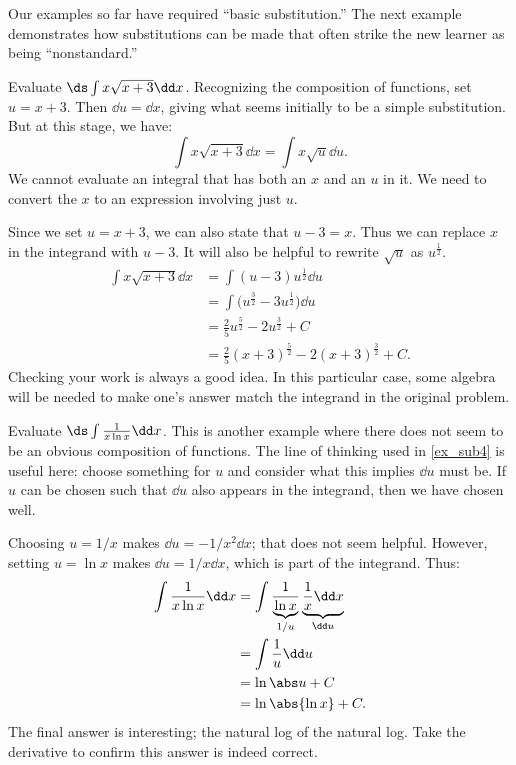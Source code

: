 Our examples so far have required ``basic substitution.'' The next example demonstrates how substitutions can be made that often strike the new learner as being ``nonstandard.''

\begin{example}\label{ex_sub4}%
Evaluate $\ds\int x\sqrt{x+3}\dd x$.
\solution
Recognizing the composition of functions, set $u = x+3$. Then $\dd u = \dd x$, giving what seems initially to be a simple substitution. But at this stage, we have:\vspace{-.3\baselineskip}
	\[\int x\sqrt{x+3}\dd x = \int x\sqrt{u}\dd u.\]
We cannot evaluate an integral that has both an $x$ and an $u$ in it. We need to convert the $x$ to an expression involving just $u$.

Since we set $u = x+3$, we can also state that $u-3 = x$. Thus we can replace $x$ in the integrand with $u-3$. It will also be helpful to rewrite $\sqrt{u}$ as $u^\frac12$.
\begin{align*}
	\int x\sqrt{x+3} \dd x
	&= \int (u-3)u^\frac12\dd u \\
	&= \int \bigl(u^\frac32 - 3u^\frac12\bigr) \dd u \\
	&= \frac25u^\frac52 - 2u^\frac32 + C \\
	&= \frac25(x+3)^\frac52 - 2(x+3)^\frac32 + C.
\end{align*}
Checking your work is always a good idea. In this particular case, some algebra will be needed to make one's answer match the integrand in the original problem.
\end{example}

\begin{example}\label{ex_sub5}%
Evaluate $\ds \int \frac{1}{x\ln x}\dd x$.
\solution
This is another example where there does not seem to be an obvious composition of functions. The line of thinking used in \autoref{ex_sub4} is useful here: choose something for $u$ and consider what this implies $\dd u$ must be. If $u$ can be chosen such that $\dd u$ also appears in the integrand, then we have chosen well.

Choosing $u = 1/x$ makes $\dd u = -1/x^2\dd x$; that does not seem helpful. However, setting $u = \ln x$ makes $\dd u = 1/x\dd x$, which is part of the integrand. Thus:
\begin{align*}
	\int \frac1{x\ln x}\dd x
	&= \int \frac{1}{\underbrace{\ln x}_{1/u}}\underbrace{\frac1x\dd x}_{\dd u} \\
	&= \int \frac1u\dd u \\
	&= \ln \abs u + C \\
	&= \ln \abs{\ln x} + C.
\end{align*}
The final answer is interesting; the natural log of the natural log. Take the derivative to confirm this answer is indeed correct.
\end{example}

